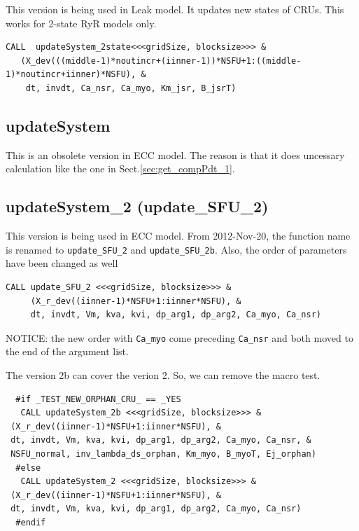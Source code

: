 This version is being used in Leak model. It updates new states of CRUs. This
works for 2-state RyR models only. 

\begin{verbatim}
CALL  updateSystem_2state<<<gridSize, blocksize>>> &
   (X_dev(((middle-1)*noutincr+(iinner-1))*NSFU+1:((middle-1)*noutincr+iinner)*NSFU), &
    dt, invdt, Ca_nsr, Ca_myo, Km_jsr, B_jsrT)
\end{verbatim}

\subsection{updateSystem}

This is an obsolete version in ECC model. The reason is that it does uncessary
calculation like the one in Sect.\ref{sec:get_compPdt_1}.

\subsection{updateSystem\_2 (update\_SFU\_2)}

This version is being used in ECC model. From 2012-Nov-20, the function name is
renamed to \verb!update_SFU_2! and \verb!update_SFU_2b!. Also, the order of
parameters have been changed as well
\begin{verbatim}
CALL update_SFU_2 <<<gridSize, blocksize>>> &
     (X_r_dev((iinner-1)*NSFU+1:iinner*NSFU), &
     dt, invdt, Vm, kva, kvi, dp_arg1, dp_arg2, Ca_myo, Ca_nsr)
\end{verbatim}
NOTICE: the new order with \verb!Ca_myo! come preceding \verb!Ca_nsr! and both
moved to the end of the argument list.

The version 2b can cover the verion 2. So, we can remove the macro test. 

\begin{verbatim}
  #if _TEST_NEW_ORPHAN_CRU_ == _YES
   CALL updateSystem_2b <<<gridSize, blocksize>>> &
 (X_r_dev((iinner-1)*NSFU+1:iinner*NSFU), &
 dt, invdt, Vm, kva, kvi, dp_arg1, dp_arg2, Ca_myo, Ca_nsr, &
 NSFU_normal, inv_lambda_ds_orphan, Km_myo, B_myoT, Ej_orphan)
  #else
   CALL updateSystem_2 <<<gridSize, blocksize>>> &
 (X_r_dev((iinner-1)*NSFU+1:iinner*NSFU), &
 dt, invdt, Vm, kva, kvi, dp_arg1, dp_arg2, Ca_myo, Ca_nsr)
  #endif
\end{verbatim}

% 

